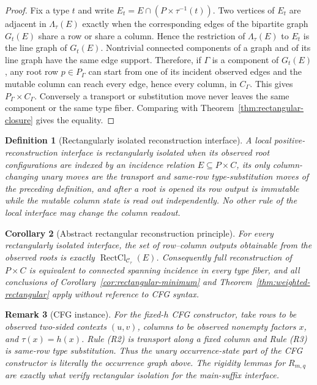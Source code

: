 \documentclass[11pt]{article}
\newtheorem{definition}{Definition}[section]
\newtheorem{corollary}[definition]{Corollary}
\newtheorem{remark}[definition]{Remark}
\newcommand{\RectCl}{\operatorname{RectCl}}
\begin{document}
\begin{proof}
Fix a type $t$ and write $E_t=E\cap(P\times\tau^{-1}(t))$.  Two vertices of
$E_t$ are adjacent in $\Lambda_\tau(E)$ exactly when the corresponding edges
of the bipartite graph $G_t(E)$ share a row or share a column.  Hence the
restriction of $\Lambda_\tau(E)$ to $E_t$ is the line graph of $G_t(E)$.
Nontrivial connected components of a graph and of its line graph have the same
edge support.  Therefore, if $\Gamma$ is a component of $G_t(E)$, any root row
$p\in P_\Gamma$ can start from one of its incident observed edges and the
mutable column can reach every edge, hence every column, in $C_\Gamma$.
This gives $P_\Gamma\times C_\Gamma$.  Conversely a transport or substitution
move never leaves the same component or the same type fiber.  Comparing with
Theorem~\ref{thm:rectangular-closure} gives the equality.
\end{proof}

\begin{definition}[Rectangularly isolated reconstruction interface]
A local positive-reconstruction interface is \emph{rectangularly isolated}
when its observed root configurations are indexed by an incidence relation
$E\subseteq P\times C$, its only column-changing unary moves are the transport
and same-row type-substitution moves of
the preceding definition, and after a root is opened its row output is
immutable while the mutable column state is read out independently.  No other
rule of the local interface may change the column readout.
\end{definition}

\begin{corollary}[Abstract rectangular reconstruction principle]
\label{cor:abstract-rectangle}
For every rectangularly isolated interface, the set of row--column outputs
obtainable from the observed roots is exactly
$\RectCl_{\mathcal C_\tau}(E)$.  Consequently full reconstruction of
$P\times C$ is equivalent to connected spanning incidence in every type
fiber, and all conclusions of Corollary~\ref{cor:rectangular-minimum} and
Theorem~\ref{thm:weighted-rectangular} apply without reference to CFG syntax.
\end{corollary}

\begin{remark}[CFG instance]
For the fixed-$h$ CFG constructor, take rows to be observed two-sided contexts
$(u,v)$, columns to be observed nonempty factors $x$, and
$\tau(x)=h(x)$.  Rule (R2) is transport along a fixed column and Rule (R3) is
same-row type substitution.  Thus the unary occurrence-state part of the CFG
constructor is literally the occurrence graph above.  The rigidity lemmas for
$R_{m,q}$ are exactly what verify rectangular isolation for the main-suffix
interface.
\end{remark}
\end{document}
